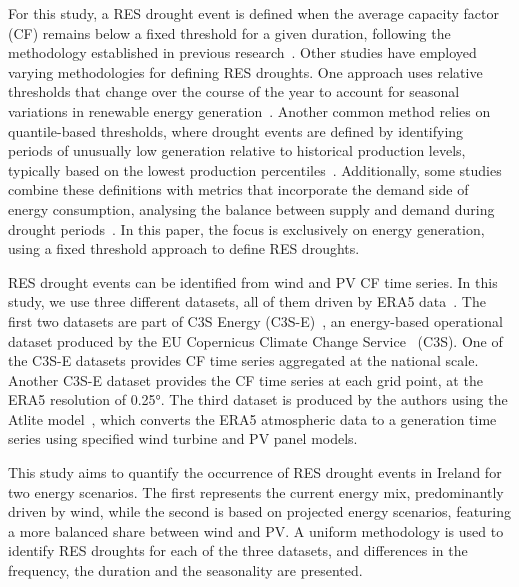 \documentclass[a4paper, 11pt]{article}
\begin{document}
For this study, a RES drought event is defined when the average capacity factor (CF) remains below a fixed threshold for a given duration, following the methodology established in previous research~\cite{kaspar2019drought, ohba2022drought, mockert2023drought, mayer2023drought}. Other studies have employed varying methodologies for defining RES droughts. One approach uses relative thresholds that change over the course of the year to account for seasonal variations in renewable energy generation~\cite{raynaud2018drought, rinaldi2021drought, gangopadhyay2022drought, allen2023drought, kapica2024drought}. Another common method relies on quantile-based thresholds, where drought events are defined by identifying periods of unusually low generation relative to historical production levels, typically based on the lowest production percentiles~\cite{bracken2024drought, allen2023drought}. Additionally, some studies combine these definitions with metrics that incorporate the demand side of energy consumption, analysing the balance between supply and demand during drought periods~\cite{raynaud2018drought, rinaldi2021drought, allen2023drought, bracken2024drought}. In this paper, the focus is exclusively on energy generation, using a fixed threshold approach to define RES droughts. 

RES drought events can be identified from wind and PV CF time series. In this study, we use three different datasets, all of them driven by ERA5 data~\cite{hersbach2020era5}. The first two datasets are part of C3S Energy (C3S-E)~\cite{cds2023energy}, an energy-based operational dataset produced by the EU Copernicus Climate Change Service~\cite{dubus2023energy} (C3S). One of the C3S-E datasets provides CF time series aggregated at the national scale. Another C3S-E dataset provides the CF time series at each grid point, at the ERA5 resolution of 0.25°. The third dataset is produced by the authors using the Atlite model~\cite{hofman2021atlite}, which converts the  ERA5 atmospheric data to a generation time series using specified wind turbine and PV panel models. 

This study aims to quantify the occurrence of RES drought events in Ireland for two energy scenarios. The first represents the current energy mix, predominantly driven by wind, while the second is based on projected energy scenarios, featuring a more balanced share between wind and PV. A uniform methodology is used to identify RES droughts for each of the three datasets, and differences in the frequency, the duration and the seasonality are presented. 
\end{document}
